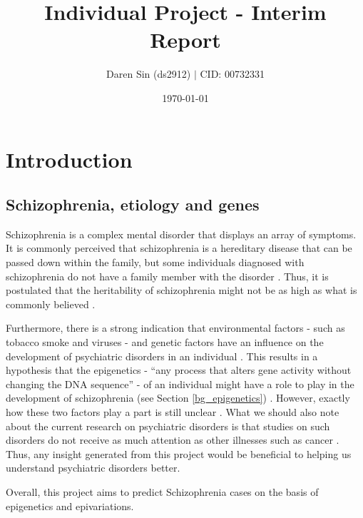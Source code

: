 \documentclass[12pt, twoside, a4paper]{article}
\begin{document}
\title{Individual Project - Interim Report}

\author{Daren Sin (ds2912) $|$ CID: 00732331}

\date{\today}
\maketitle

\section{Introduction}


\subsection{Schizophrenia, etiology and genes}

Schizophrenia is a complex mental disorder that displays an array of symptoms. It is commonly perceived that schizophrenia is a hereditary disease that can be passed down within the family, but some individuals diagnosed with schizophrenia do not have a family member with the disorder \cite{RefWorks:8}. Thus, it is postulated that the heritability of schizophrenia might not be as high as what is commonly believed \cite{RefWorks:9}.

Furthermore, there is a strong indication that environmental factors - such as tobacco smoke and viruses - and genetic factors have an influence on the development of psychiatric disorders in an individual \cite{RefWorks:8, RefWorks:10}. This results in a hypothesis that the epigenetics - ``any process that alters gene activity without changing the DNA sequence'' - of an individual might have a role to play in the development of schizophrenia (see Section \ref{bg_epigenetics}) \cite{RefWorks:12}. However, exactly how these two factors play a part is still unclear \cite{RefWorks:11}. What we should also note about the current research on psychiatric disorders is that studies on such disorders do not receive as much attention as other illnesses such as cancer \cite{RefWorks:82}. Thus, any insight generated from this project would be beneficial to helping us understand psychiatric disorders better.

Overall, this project aims to predict Schizophrenia cases on the basis of epigenetics and epivariations.
\end{document}
